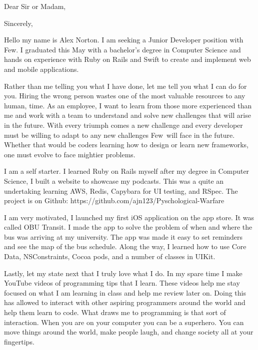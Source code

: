 \documentclass{my_cv}
\begin{document}
\newcommand{\companyName}{Few} %
\newcommand{\jobTitle}{Junior Developer }
\recipient{\companyName \ Recruitment team}{\companyName }
\date{\today}
\opening{Dear Sir or Madam,}
\closing{Sincerely,}
\makelettertitle


\indent Hello my name is Alex Norton.  I am seeking a \jobTitle
position with \companyName .  I graduated this May with a bachelor’s degree in
Computer Science and hands on experience with Ruby on Rails and Swift to create and
implement web and mobile applications.

Rather than me telling you what I have done, let me tell you what I can do for
you.  Hiring the wrong person wastes one of the most valuable resources to any
human, time.  As an employee, I want to learn from those more experienced 
than me and work with a team to understand and solve new challenges that will 
arise in the future.  With every triumph comes a new challenge and every 
developer must be willing to adapt to any new challenges \companyName \ will 
face in the future.  Whether that would be coders learning how to design or
learn new frameworks, one must evolve to face mightier problems.

I am a self starter.  I learned Ruby on Rails myself after my degree in Computer
Science, I built a website to showcase my podcasts.  This was a quite an undertaking
learning AWS, Redis, Capybara for UI testing, and RSpec.  The project is on Github: 
https://github.com/ajn123/Pyschological-Warfare

I am very motivated, I launched my first iOS application on the app store.  It was called
OBU Transit.  I made the app to solve the problem of when and where the bus was
arriving at my university.  The app was made it easy to set reminders and see
the map of the bus schedule.  Along the way, I learned how to use Core Data,
NSConstraints, Cocoa pods, and a number of classes in UIKit.  

Lastly, let my state next that I truly love what I do.  In my spare time
I make YouTube videos of programming tips that I learn.  These videos
help me stay focused on what I am learning in class and help me review
later on.  Doing this has allowed to interact with other aspiring
programmers around the world and help them learn to code.  What draws me
to programming is that sort of interaction.  When you are on your
computer you can be a superhero.  You can move things around the world,
make people laugh, and change society all at your fingertips.
\end{document}
